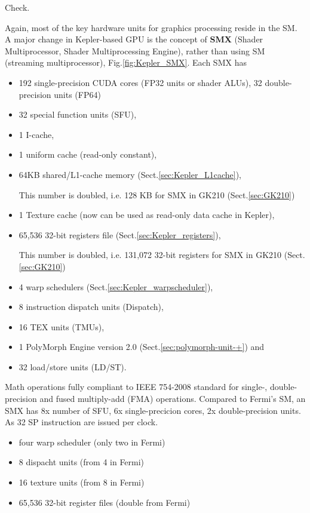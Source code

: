 Check.

Again, most of the key hardware units for graphics processing reside in the SM.
A major change in Kepler-based GPU is the concept of {\bf SMX} (Shader
Multiprocessor, Shader Multiprocessing Engine), rather than using SM (streaming
multiprocessor), Fig.\ref{fig:Kepler_SMX}. Each SMX has 
\begin{itemize}
  \item 192 single-precision CUDA cores (FP32 units or shader ALUs), 32
  double-precision units (FP64)
  
  \item 32 special function units (SFU), 
  
  \item 1 I-cache, 
  
  \item 1 uniform cache (read-only constant), 
  
  \item 64KB shared/L1-cache memory (Sect.\ref{sec:Kepler_L1cache}), 
  
 This number is doubled, i.e. 128 KB for SMX in GK210 (Sect.\ref{sec:GK210})
  
  \item 1 Texture cache (now can be used as read-only data cache in Kepler), 

   \item 65,536 32-bit registers file (Sect.\ref{sec:Kepler_registers}),

This number is doubled, i.e. 131,072 32-bit registers for SMX in GK210
(Sect.\ref{sec:GK210})

   \item 4 warp schedulers (Sect.\ref{sec:Kepler_warpscheduler}),

   \item 8 instruction dispatch units (Dispatch),
   
   \item 16 TEX units (TMUs), 
   
   \item 1 PolyMorph Engine version 2.0
   (Sect.\ref{sec:polymorph-unit-+}) and 
   
   \item 32 load/store units (LD/ST).
\end{itemize}

Math operations fully compliant to IEEE 754-2008
standard for single-, double-precision and fused multiply-add (FMA) operations.
Compared to Fermi's SM, an SMX has 8x number of SFU, 6x single-precicion cores,
2x double-precision units. As 32 SP instruction are issued per clock.
\begin{itemize}
  \item four warp scheduler (only two in Fermi)
  \item 8 dispacht units (from 4 in Fermi)
  \item 16 texture units (from 8 in Fermi)
  \item 65,536 32-bit register files (double from Fermi)
  
\end{itemize}



